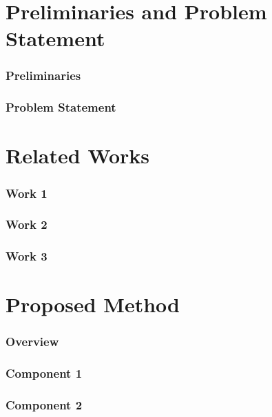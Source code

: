 \documentclass[aspectratio=169]{beamer}
\begin{document}
\section{Preliminaries and Problem Statement}
\begin{frame}
\frametitle{Preliminaries}

\end{frame}

\begin{frame}
\frametitle{Problem Statement}

\end{frame}

\section{Related Works}
\begin{frame}
\frametitle{Work 1}

\end{frame}

\begin{frame}
\frametitle{Work 2}

\end{frame}

\begin{frame}
\frametitle{Work 3}

\end{frame}

\section{Proposed Method}

\begin{frame}
\frametitle{Overview}

\end{frame}


\begin{frame}
\frametitle{Component 1}

\end{frame}

\begin{frame}
\frametitle{Component 2}

\end{frame}
\end{document}
